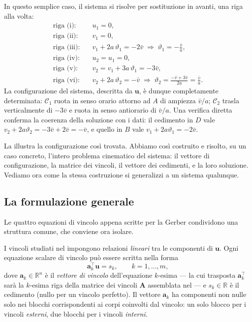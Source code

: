 In questo semplice caso, il sistema si risolve
per sostituzione in avanti, una riga alla volta:
\begin{align*}
	\text{riga (i):}&\quad u_1 = 0,\\
	\text{riga (ii):}&\quad v_1 = 0,\\
	\text{riga (iii):}&\quad v_1+2a\,\vartheta_1=-2\bar v
	\;\Longrightarrow\; \vartheta_1=-\frac{\bar v}{a},\\
	\text{riga (iv):}&\quad u_2=u_1=0,\\
	\text{riga (v):}&\quad v_2=v_1+3a\,\vartheta_1=-3\bar v,\\
	\text{riga (vi):}&\quad v_2+2a\,\vartheta_2=-\bar v
	\;\Longrightarrow\;
	\vartheta_2=\frac{-\bar v+3\bar v}{2a}=\frac{\bar v}{a}.
\end{align*}
La configurazione del sistema, descritta da $\bm{u}$, è dunque completamente determinata:
$\mathcal{C}_1$ ruota in senso orario attorno ad $A$ di ampiezza
$\bar v/a$; $\mathcal{C}_2$ trasla verticalmente di $-3\bar v$ e ruota
in senso antiorario di $\bar v/a$. Una verifica diretta conferma la
coerenza della soluzione con i dati: il cedimento in $D$ vale
$v_2+2a\vartheta_2=-3\bar v+2\bar v=-\bar v$, e quello in $B$
vale $v_1+2a\vartheta_1=-2\bar v$.

La  illustra la configurazione così
trovata.
%
Abbiamo così costruito e risolto, su un caso concreto, l'intero
problema cinematico del sistema: il vettore di configurazione, la
matrice dei vincoli, il vettore dei cedimenti, e la loro soluzione.
Vediamo ora come la stessa costruzione si generalizzi a un sistema
qualunque.







\subsection{La formulazione generale}\label{sec:congruenza_generale}

Le quattro equazioni di vincolo appena scritte per la Gerber
condividono una struttura comune, che conviene ora isolare. 




I vincoli  studiati nel  impongono
relazioni \emph{lineari} tra le componenti di $\bm{u}$. Ogni
equazione scalare di vincolo può essere scritta nella forma
\begin{equation}\label{eq:vincolo_scalare}
	\bm{a}_k^{\top}\bm{u} = s_k,
	\qquad k = 1, \dots, m,
\end{equation}
dove $\bm{a}_k \in \mathbb{R}^{n}$ è il \emph{vettore di vincolo}
dell'equazione $k$-esima --- la cui trasposta $\bm{a}_k^{\top}$
sarà la $k$-esima riga della matrice dei vincoli $\bm{A}$
assemblata nel  --- e $s_k \in \mathbb{R}$
è il cedimento (nullo per un vincolo perfetto).
Il vettore $\bm{a}_k$ ha componenti non nulle solo nei blocchi corrispondenti ai corpi
coinvolti dal vincolo: un solo blocco per i vincoli
\emph{esterni}, due blocchi per i vincoli \emph{interni}.

